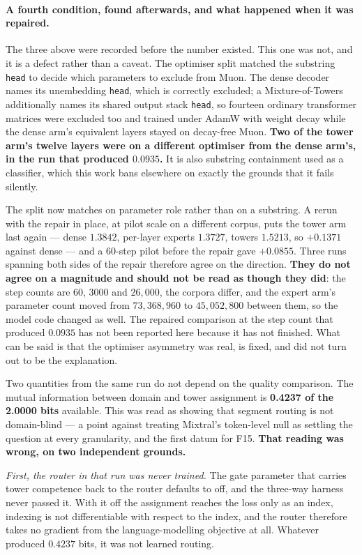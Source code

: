 \documentclass[11pt]{article}
\begin{document}
\paragraph{A fourth condition, found afterwards, and what happened when it was repaired.} The three above were recorded before the number existed. This one was not, and it is a defect rather than a caveat. The optimiser split matched the substring \texttt{head} to decide which parameters to exclude from Muon. The dense decoder names its unembedding \texttt{head}, which is correctly excluded; a Mixture-of-Towers additionally names its shared output stack \texttt{head}, so fourteen ordinary transformer matrices were excluded too and trained under AdamW with weight decay while the dense arm's equivalent layers stayed on decay-free Muon. \textbf{Two of the tower arm's twelve layers were on a different optimiser from the dense arm's, in the run that produced $0.0935$.} It is also substring containment used as a classifier, which this work bans elsewhere on exactly the grounds that it fails silently.

The split now matches on parameter role rather than on a substring. A rerun with the repair in place, at pilot scale on a different corpus, puts the tower arm last again --- dense $1.3842$, per-layer experts $1.3727$, towers $1.5213$, so $+0.1371$ against dense --- and a 60-step pilot before the repair gave $+0.0855$. Three runs spanning both sides of the repair therefore agree on the direction. \textbf{They do not agree on a magnitude and should not be read as though they did}: the step counts are $60$, $3000$ and $26{,}000$, the corpora differ, and the expert arm's parameter count moved from $73{,}368{,}960$ to $45{,}052{,}800$ between them, so the model code changed as well. The repaired comparison at the step count that produced $0.0935$ has not been reported here because it has not finished. What can be said is that the optimiser asymmetry was real, is fixed, and did not turn out to be the explanation.

Two quantities from the same run do not depend on the quality comparison. The mutual information between domain and tower assignment is \textbf{0.4237 of the 2.0000 bits} available. This was read as showing that segment routing is not domain-blind --- a point against treating Mixtral's token-level null as settling the question at every granularity, and the first datum for F15. \textbf{That reading was wrong, on two independent grounds.}

\emph{First, the router in that run was never trained.} The gate parameter that carries tower competence back to the router defaults to off, and the three-way harness never passed it. With it off the assignment reaches the loss only as an index, indexing is not differentiable with respect to the index, and the router therefore takes no gradient from the language-modelling objective at all. Whatever produced $0.4237$ bits, it was not learned routing.
\end{document}
